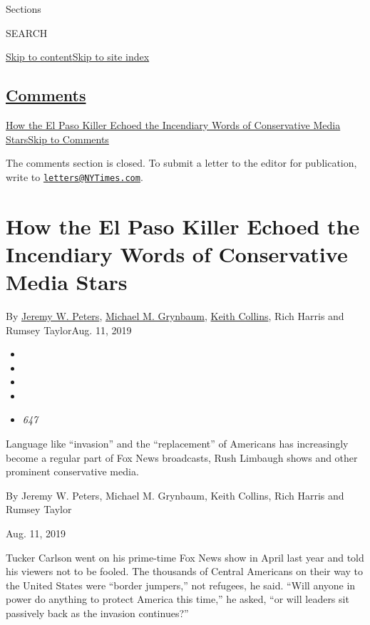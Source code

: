 Sections

SEARCH

\protect\hyperlink{site-content}{Skip to
content}\protect\hyperlink{site-index}{Skip to site index}

\hypertarget{comments}{%
\subsection{\texorpdfstring{\protect\hyperlink{commentsContainer}{Comments}}{Comments}}\label{comments}}

\href{}{How the El Paso Killer Echoed the Incendiary Words of
Conservative Media Stars}\href{}{Skip to Comments}

The comments section is closed. To submit a letter to the editor for
publication, write to
\href{mailto:letters@NYTimes.com}{\nolinkurl{letters@NYTimes.com}}.

\hypertarget{how-the-el-paso-killer-echoed-the-incendiary-words-of-conservative-media-stars}{%
\section{How the El Paso Killer Echoed the Incendiary Words of
Conservative Media
Stars}\label{how-the-el-paso-killer-echoed-the-incendiary-words-of-conservative-media-stars}}

By \href{https://www.nytimes3xbfgragh.onion/by/jeremy-w-peters}{Jeremy
W. Peters},
\href{https://www.nytimes3xbfgragh.onion/by/michael-m-grynbaum}{Michael
M. Grynbaum},
\href{https://www.nytimes3xbfgragh.onion/by/keith-collins}{Keith
Collins}, Rich Harris and Rumsey TaylorAug. 11, 2019

\begin{itemize}
\item
\item
\item
\item
\item
  \emph{647}
\end{itemize}

Language like ``invasion'' and the ``replacement'' of Americans has
increasingly become a regular part of Fox News broadcasts, Rush Limbaugh
shows and other prominent conservative media.

By Jeremy W. Peters, Michael M. Grynbaum, Keith Collins, Rich Harris and
Rumsey Taylor

Aug. 11, 2019

Tucker Carlson went on his prime-time Fox News show in April last year
and told his viewers not to be fooled. The thousands of Central
Americans on their way to the United States were ``border jumpers,'' not
refugees, he said. ``Will anyone in power do anything to protect America
this time,'' he asked, ``or will leaders sit passively back as the
invasion continues?''


